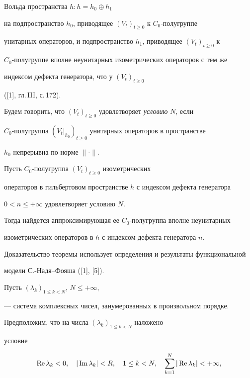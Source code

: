 Вольда пространства $h:h=h_0\oplus h_1$


на подпространство $h_0$, приводящее $(V_t)_{t\geq 0}$ к $C_0$-полугруппе


унитарных операторов, и подпространство $h_1$, приводящее $(V_t)_{t\geq 0}$ к


$C_0$-полугруппе вполне неунитарных изометрических операторов с тем же


индексом дефекта генератора, что у $(V_t)_{t\geq 0}$


([1], гл.\,III, с.\,172).


Будем говорить, что $(V_t)_{t\geq 0}$ удовлетворяет {\it условию} $N$, если


$C_0$-полугруппа $(V_t|_{h_0})_{t\geq 0}$ унитарных операторов в пространстве


$h_0$ непрерывна по норме $\|\cdot \|$.





\begin{thmnonum}


Пусть $C_0$-полугруппа $(V_t)_{t\geq 0}$ изометрических


операторов в гильбертовом пространстве $h$ с индексом дефекта генератора


$0<n\leq +\infty $ удовлетворяет условию $N$.





Тогда найдется аппроксимирующая ее $C_0$-полугруппа вполне неунитарных


изометрических операторов в $h$ с индексом дефекта генератора $n$.


\end{thmnonum}





Доказательство теоремы использует определения и результаты функциональной


модели \linebreak С.-Надя--Фояша ([1], [5]).


Пусть $(\lambda_k)_{1\leq k<N}$, $N\leq +\infty$,


--- система комплексных чисел, занумерованных в произвольном порядке.


Предположим, что на числа $(\lambda_k)_{1\leq k<N}$ наложено


условие


\begin{equation}


\re\lambda_k<0,\quad |\im\lambda_k|<R,


\quad 1\leq k<N,\quad \sum_{k=1}^{N}


|\re\lambda_k|<+\infty,


\end{equation}


